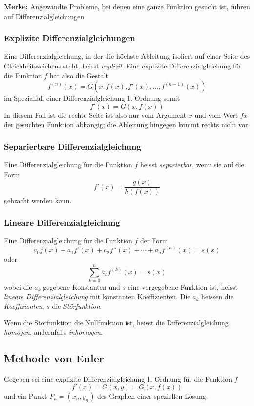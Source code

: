 \documentclass[10pt,a4paper]{scrartcl}
\begin{document}
\textbf{Merke:} Angewandte Probleme, bei denen eine ganze Funktion gesucht ist,
führen auf Differenzialgleichungen.


\subsubsection{Explizite Differenzialgleichungen}

Eine Differenzialgleichung, in der die höchste Ableitung isoliert auf einer
Seite des Gleichheitszeichens steht, heisst \emph{explizit}. Eine explizite
Differenzialgleichung für die Funktion $f$ hat also die Gestalt
$$f^{(n)}(x) = G\left(x,f(x),f'(x),\dotsc,f^{(n-1)}(x)\right)$$
im Spezialfall einer Differenzialgleichung 1. Ordnung somit
$$f'(x) = G(x,f(x))$$
In diesem Fall ist die rechte Seite ist also nur vom Argument $x$ und vom Wert
$fx$ der gesuchten Funktion abhängig; die Ableitung hingegen kommt rechts nicht
vor.


\subsubsection{Separierbare Differenzialgleichung}

Eine Differenzialgleichung für die Funktion $f$ heisst \emph{separierbar}, wenn
sie auf die Form
$$f'(x) = \frac{g(x)}{h(f(x))}$$
gebracht werden kann.


\subsubsection{Lineare Differenzialgleichung}

Eine Differenzialgleichung für die Funktion $f$ der Form
$$a_0 f(x) + a_1 f'(x) + a_2 f''(x) + \dotsb + a_n f^{(n)}(x) = s(x)$$
oder
$$\sum\limits_{k=0}^n a_k f^{(k)}(x) = s(x)$$
wobei die $a_k$ gegebene Konstanten und $s$ eine vorgegebene Funktion ist,
heisst \emph{lineare Differenzialgleichung} mit konstanten Koeffizienten. Die
$a_k$ heissen die \emph{Koeffizienten}, $s$ die \emph{Störfunktion}.

Wenn die Störfunktion die Nullfunktion ist, heisst die Differenzialgleichung
\emph{homogen}, andernfalls \emph{inhomogen}.


\subsection{Methode von Euler}

Gegeben sei eine explizite Differenzialgleichung 1. Ordnung für die Funktion $f$
$$f'(x) = G(x, y) = G(x,f(x))$$
und ein Punkt $P_n = (x_n,y_n)$ des Graphen einer speziellen Lösung.
\end{document}
